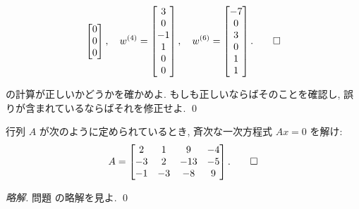 \documentclass[12pt,twoside]{jarticle}
\newcommand\commentout[1]{#1}
\newcommand\commentout[1]{}
\begin{document}
\begin{example}
\begin{equation*}
\begin{bmatrix}
      0 \\
      0 \\
      0 \\
    \end{bmatrix},
    \quad
    w^{(4)} =
    \begin{bmatrix}
      3 \\
      0 \\
      -1 \\
      1 \\
      0 \\
      0 \\
    \end{bmatrix},
    \quad
    w^{(6)} =
    \begin{bmatrix}
      -7 \\
      0 \\
      3 \\
      0 \\
      1 \\
      1 \\
    \end{bmatrix}.
    \qed
  \end{equation*}
\end{example}

\begin{question}[5点]
  の計算が正しいかどうかを確かめよ.
  もしも正しいならばそのことを確認し, 誤りが含まれているならばそれを修正せよ.
  \qed
\end{question}


\begin{question}[5点]
  \label{q:sol-hom-1}
  行列 $A$ が次のように定められているとき, 
  斉次な一次方程式 $Ax=0$ を解け:
  \begin{equation*}
    A = 
    \begin{bmatrix}
       2 &  1 &   9 & -4 \\
      -3 &  2 & -13 & -5 \\
      -1 & -3 &  -8 &  9 \\
    \end{bmatrix}.
    \qed
  \end{equation*}
\end{question}

\commentout{
\begin{proof}[略解]
  問題  の略解を見よ. \qed
\end{proof}
}
\end{document}
